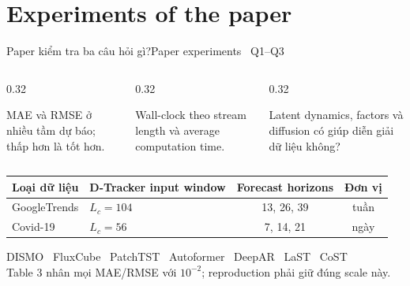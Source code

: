 \section{Experiments of the paper}

\begin{frame}[shrink=21]{Paper kiểm tra ba câu hỏi gì?}{Paper experiments \textperiodcentered\ Q1--Q3}
\begin{columns}[T,onlytextwidth]
\begin{column}{0.32\textwidth}
\begin{intuition}
  MAE và RMSE ở nhiều tầm dự báo; thấp hơn là tốt hơn.
\end{intuition}
\end{column}
\begin{column}{0.32\textwidth}
\begin{mathcard}
  Wall-clock theo stream length và average computation time.
\end{mathcard}
\end{column}
\begin{column}{0.32\textwidth}
\begin{takeaway}
  Latent dynamics, factors và diffusion có giúp diễn giải dữ liệu không?
\end{takeaway}
\end{column}
\end{columns}
\vspace{5mm}
\centering
{\small
\begin{tabular}{@{}llcc@{}}
  \toprule
  Loại dữ liệu & D-Tracker input window & Forecast horizons & Đơn vị\\
  \midrule
  GoogleTrends & $L_c=104$ & 13, 26, 39 & tuần\\
  Covid-19 & $L_c=56$ & 7, 14, 21 & ngày\\
  \bottomrule
\end{tabular}}
\vspace{4mm}
\begin{questioncard}
  \par
  DISMO \textperiodcentered\ FluxCube \textperiodcentered\ PatchTST \textperiodcentered\ Autoformer \textperiodcentered\ DeepAR \textperiodcentered\ LaST \textperiodcentered\ CoST\\[1mm]
  {\small Table 3 nhân mọi MAE/RMSE với $10^{-2}$; reproduction phải giữ đúng scale này.}
\end{questioncard}
\vspace{2mm}
\end{frame}

